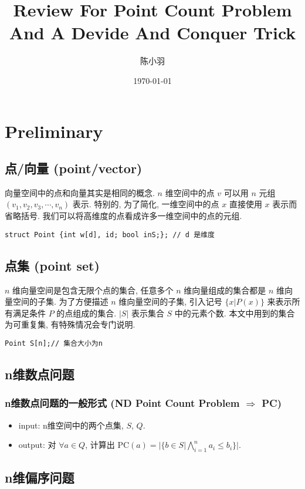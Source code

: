 \documentclass[11pt]{article}
\author{陈小羽}
\date{\today}
\title{Review For Point Count Problem And A Devide And Conquer Trick}
\begin{document}
\maketitle
\tableofcontents


\section{Preliminary}
\label{sec:org959a04d}
\subsection{点/向量 (point/vector)}
\label{sec:orgee80bc7}
向量空间中的点和向量其实是相同的概念.
\(n\) 维空间中的点 \(v\) 可以用 \(n\) 元组 \((v_1, v_2, v_3, \cdots, v_n)\) 表示.
特别的, 为了简化, 一维空间中的点 \(x\) 直接使用 \(x\) 表示而省略括号.
我们可以将高维度的点看成许多一维空间中的点的元组.
\begin{verbatim}
struct Point {int w[d], id; bool inS;}; // d 是维度
\end{verbatim}
\subsection{点集 (point set)}
\label{sec:org2eec417}
\(n\) 维向量空间是包含无限个点的集合, 任意多个 \(n\) 维向量组成的集合都是 \(n\) 维向量空间的子集.
为了方便描述 \(n\) 维向量空间的子集, 引入记号 \(\{ x | P(x)\}\) 来表示所有满足条件 \(P\) 的点组成的集合.
\(|S|\) 表示集合 \(S\) 中的元素个数. 本文中用到的集合为可重复集, 有特殊情况会专门说明.
\begin{verbatim}
Point S[n];// 集合大小为n
\end{verbatim}
\subsection{n维数点问题}
\label{sec:orgef9e842}
\subsubsection{n维数点问题的一般形式 (ND Point Count Problem \(\Rightarrow\) PC)}
\label{sec:orgd8eb115}
\begin{itemize}
\item input: n维空间中的两个点集, \(S\), \(Q\).
\item output: 对 \(\forall a \in Q\), 计算出 \(\mbox{PC}(a) = |\{ b\in S| \bigwedge_{i=1}^n a_i\leq b_i\}|\).
\end{itemize}
\subsection{n维偏序问题}
\label{sec:orge3a22ab}
\end{document}
